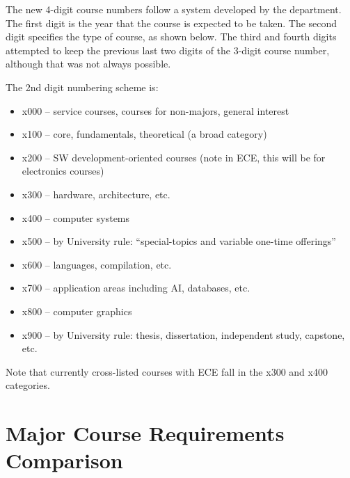\documentclass[10pt,letter]{book}
\newenvironment{itemlist}{
\begin{itemize}
\setlength{\itemsep}{0pt}
\setlength{\parskip}{0pt}}
{\end{itemize}}
\newcommand{\mysection}[1]{\section{#1}\renewcommand{\rightmark}{#1}}
\begin{document}
The new 4-digit course numbers follow a system developed by the
department. The first digit is the year that the course is expected
to be taken. The second digit specifies the type of course, as shown
below. The third and fourth digits attempted to keep the previous
last two digits of the 3-digit course number, although that was not
always possible. 


The 2nd digit numbering scheme is:

\begin{itemlist}
\item x000 – service courses, courses for non-majors, general interest
\item x100 – core, fundamentals, theoretical (a broad category)
\item x200 – SW development-oriented courses (note in ECE, this will
 be for electronics courses)
\item x300 – hardware, architecture, etc.
\item x400 – computer systems
\item x500 – by University rule: ``special-topics and variable one-time
 offerings''
\item x600 – languages, compilation, etc.
\item x700 – application areas including AI, databases, etc.
\item x800 – computer graphics
\item x900 – by University rule: thesis, dissertation, independent
 study, capstone, etc.
\end{itemlist}

Note that currently cross-listed courses with ECE fall in the x300 and
x400 categories.


\clearpage

\mysection{Major Course Requirements Comparison}

\begin{figure}[h!]
\begin{center}
\end{center}
\end{figure}
\end{document}
